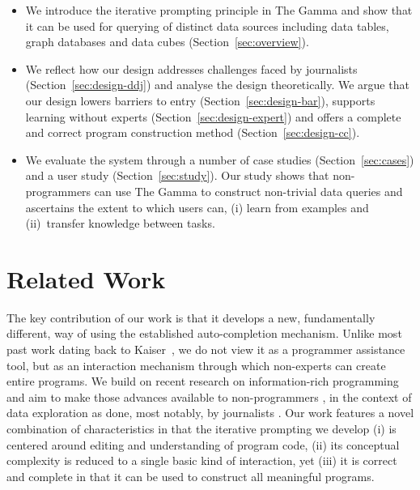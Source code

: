 \documentclass[manuscript,review,anonymous]{acmart}
\begin{document}
\begin{itemize}
\item We introduce the iterative prompting principle in The Gamma
  and show that it can be used for querying of distinct data sources including data tables, graph
  databases and data cubes (Section~\ref{sec:overview}).

\item We reflect how our design addresses challenges faced by journalists (Section~\ref{sec:design-ddj})
  and analyse the design theoretically. We argue that our design lowers barriers to entry (Section~\ref{sec:design-bar}),
  supports learning without experts (Section~\ref{sec:design-expert}) and offers a
  complete and correct program construction method (Section~\ref{sec:design-cc}).

\item We evaluate the system through a number of case studies (Section~\ref{sec:cases})
  and a user study (Section~\ref{sec:study}). Our study shows that non-programmers can use The Gamma
  to construct non-trivial data queries and ascertains the extent to which users can,
  (i) learn from examples and (ii)~transfer knowledge between tasks.
\end{itemize}


\section{Related Work}

The key contribution of our work is that it develops a new, fundamentally different, way of using the
established auto-completion mechanism. Unlike most past work dating back to Kaiser~\cite{assistants},
we do not view it as a programmer assistance tool, but as an interaction mechanism through which
non-experts can create entire programs. We build on recent research on information-rich
programming \cite{inforich} and aim to make those advances available to non-programmers
\cite{enduser,smallmatter}, in the context of data exploration as done, most notably, by
journalists \cite{ddj}. Our work features a novel combination of characteristics in that
the iterative prompting we develop (i) is centered around editing and understanding of program code,
(ii) its conceptual complexity is reduced to a single basic kind of interaction, yet (iii) it is
correct and complete in that it can be used to construct all meaningful programs.
\end{document}

